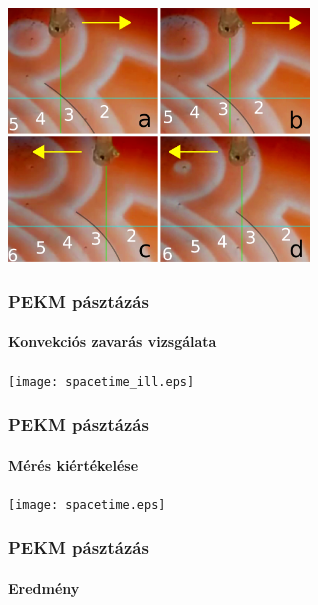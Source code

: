 \documentclass{beamer}
\begin{document}
\begin{frame}
	\centering
	\includegraphics[width=0.6\textwidth]{grabs.png}
	\frametitle{PEKM pásztázás}
	\framesubtitle{Konvekciós zavarás vizsgálata}
\end{frame}

\begin{frame}
	\centering
	\texttt{[image: spacetime\_ill.eps]}
	\frametitle{PEKM pásztázás}
	\framesubtitle{Mérés kiértékelése}
\end{frame}

\begin{frame}
	\centering
	\texttt{[image: spacetime.eps]}
	\frametitle{PEKM pásztázás}
	\framesubtitle{Eredmény}
\end{frame}
\end{document}
